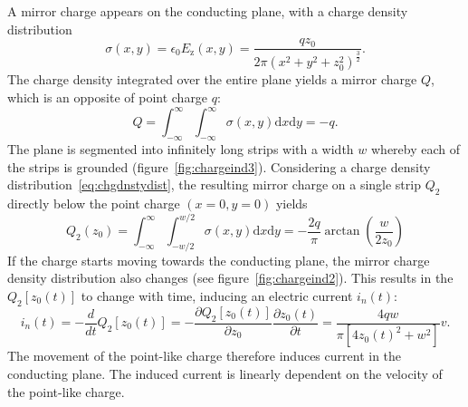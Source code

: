 A mirror charge appears on the conducting plane, with a charge density distribution
\begin{equation}
\label{eq:chgdnstydist}
\sigma(x,y)=\epsilon_\mathrm{0}E_\mathrm{z}(x,y)=\frac{qz_\mathrm{0}}{2\pi(x^2+y^2+z_0^2)^\frac{3}{2}}.
\end{equation}
The charge density integrated over the entire plane yields a mirror charge $Q$, which is an opposite of point charge $q$:
\begin{equation}
\label{eq:chargedensity}
Q=\int_{-\infty}^{\infty} \int_{-\infty}^{\infty} \sigma(x,y)\mathrm{d}x\mathrm{d}y = -q.
\end{equation}
The plane is segmented into infinitely long strips with a width $w$ whereby each of the strips is grounded (figure~\ref{fig:chargeind3}). Considering a charge density distribution~\ref{eq:chgdnstydist}, the resulting mirror charge on a single strip $Q_\mathrm{2}$ directly below the point charge $(x=0, y=0)$ yields
\begin{equation}
\label{eq:stripcharge}
Q_\mathrm{2}(z_\mathrm{0})=\int_{-\infty}^{\infty}\int_{-w/2}^{w/2}\sigma(x,y)\mathrm{d}x\mathrm{d}y = -\frac{2q}{\pi}\arctan\left(\frac{w}{2z_\mathrm{0}}\right)
\end{equation} 
If the charge starts moving towards the conducting plane, the mirror charge density distribution also changes (see figure~\ref{fig:chargeind2}). This results in the $Q_2[z_0(t)]$ to change with time, inducing an electric current $i_n(t)$:
 \begin{equation}
 \label{eq:indcurr}
 i_n(t) = -\frac{d}{dt}Q_\mathrm{2}[z_\mathrm{0}(t)] = -\frac{\partial Q_\mathrm{2}[z_\mathrm{0}(t)]}{\partial z_\mathrm{0}}\frac{\partial z_\mathrm{0}(t)}{\partial t} = \frac{4qw}{\pi[4z_\mathrm{0}(t)^2 + w^2]}v. 
 \end{equation}
 The movement of the point-like charge therefore induces current in the conducting plane. The induced current is linearly dependent on the velocity of the point-like charge.

